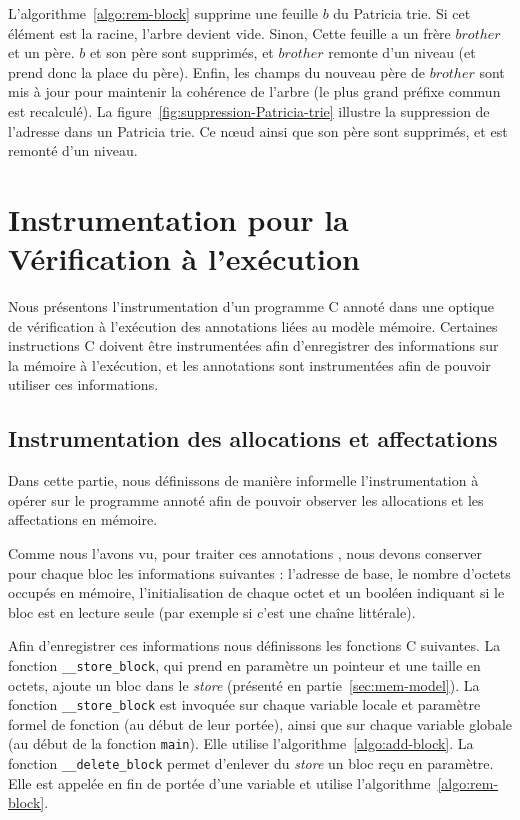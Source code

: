 


L'algorithme~\ref{algo:rem-block} supprime une feuille $b$ du Patricia trie.
Si cet élément est la racine, l'arbre devient vide.
Sinon, Cette feuille a un frère $\mathit{brother}$ et un père.
$b$ et son père sont supprimés, et $\mathit{brother}$ remonte d'un niveau (et
prend donc la place du père).
Enfin, les champs du nouveau père de $\mathit{brother}$ sont mis à jour pour
maintenir la cohérence de l'arbre (le plus grand préfixe commun est recalculé).
La figure~\ref{fig:suppression-Patricia-trie} illustre la suppression de
l'adresse  dans un Patricia trie.
Ce n\oe{}ud ainsi que son père  sont supprimés, et
 est remonté d'un niveau.


\section{Instrumentation pour la Vérification à l'exécution}
\label{sec:mem-instru}


Nous présentons l'instrumentation d'un programme C annoté dans une optique de
vérification à l'exécution des annotations liées au modèle mémoire.
Certaines instructions C doivent être instrumentées afin d'enregistrer
des informations sur la mémoire à l'exécution, et les annotations sont
instrumentées afin de pouvoir utiliser ces informations.


\subsection{Instrumentation des allocations et affectations}


Dans cette partie, nous définissons de manière informelle l'instrumentation à
opérer sur le programme annoté afin de pouvoir observer les allocations et
les affectations en mémoire.

Comme nous l'avons vu, pour traiter ces annotations \eacsl, nous devons
conserver pour chaque bloc les informations suivantes : l'adresse de base, le
nombre d'octets occupés en mémoire, l'initialisation de chaque octet et un
booléen indiquant si le bloc est en lecture seule (par exemple si c'est une
chaîne littérale).

Afin d'enregistrer ces informations nous définissons les fonctions C suivantes.
La fonction \lstinline'__store_block', qui prend en paramètre un pointeur et une
taille en octets, ajoute un bloc dans le \textit{store} (présenté en
partie~\ref{sec:mem-model}).
La fonction \lstinline'__store_block' est invoquée sur chaque variable locale
et paramètre formel de fonction (au début de leur portée), ainsi que sur chaque
variable globale (au début de la fonction \lstinline'main').
Elle utilise l'algorithme~\ref{algo:add-block}.
La fonction \lstinline'__delete_block' permet d'enlever du \textit{store} un
bloc reçu en paramètre.
Elle est appelée en fin de portée d'une variable et utilise
l'algorithme~\ref{algo:rem-block}.

